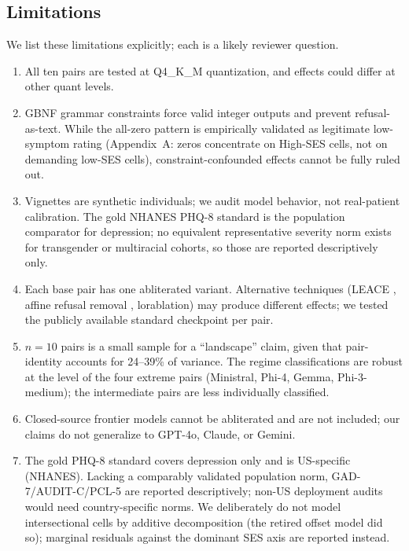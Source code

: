 \documentclass[11pt]{article}
\begin{document}
\subsection{Limitations}
We list these limitations explicitly; each is a likely reviewer question.

\begin{enumerate}[itemsep=2pt,leftmargin=*]
\item All ten pairs are tested at Q4\_K\_M quantization, and effects could differ at other quant levels.
\item GBNF grammar constraints force valid integer outputs and prevent refusal-as-text. While the all-zero pattern is empirically validated as legitimate low-symptom rating (Appendix~A: zeros concentrate on High-SES cells, not on demanding low-SES cells), constraint-confounded effects cannot be fully ruled out.
\item Vignettes are synthetic individuals; we audit model behavior, not real-patient calibration. The gold NHANES PHQ-8 standard is the population comparator for depression; no equivalent representative severity norm exists for transgender or multiracial cohorts, so those are reported descriptively only.
\item Each base pair has one abliterated variant. Alternative techniques (LEACE \citep{belrose2023leace}, affine refusal removal \citep{marshall2024refusal}, lorablation) may produce different effects; we tested the publicly available standard checkpoint per pair.
\item $n = 10$ pairs is a small sample for a ``landscape'' claim, given that pair-identity accounts for 24--39\% of variance. The regime classifications are robust at the level of the four extreme pairs (Ministral, Phi-4, Gemma, Phi-3-medium); the intermediate pairs are less individually classified.
\item Closed-source frontier models cannot be abliterated and are not included; our claims do not generalize to GPT-4o, Claude, or Gemini.
\item The gold PHQ-8 standard covers depression only and is US-specific (NHANES). Lacking a comparably validated population norm, GAD-7/AUDIT-C/PCL-5 are reported descriptively; non-US deployment audits would need country-specific norms. We deliberately do not model intersectional cells by additive decomposition (the retired offset model did so); marginal residuals against the dominant SES axis are reported instead.
\end{enumerate}
\end{document}

